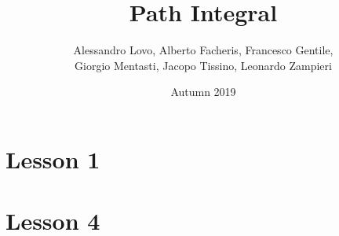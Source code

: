 \documentclass{article}
\title{Path Integral}
\author{Alessandro Lovo, Alberto Facheris, Francesco Gentile,\\
    Giorgio Mentasti, Jacopo Tissino, Leonardo Zampieri}
\date{Autumn 2019}
\begin{document}
\maketitle

\section{Lesson 1}


\section{Lesson 4}

\end{document}
